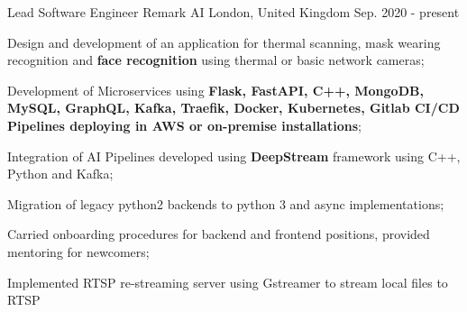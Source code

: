 

\begin{cventries}

   \cventry
    {Lead Software Engineer} %
    {Remark AI} %
    {London,  United Kingdom} %
    {Sep. 2020 - present} %
    {
      \begin{cvitems} %
        \item {Design and development of an application for thermal scanning,
        mask wearing recognition and \textbf{face recognition} using thermal or basic network cameras;}
        \item {Development of Microservices using \textbf{Flask, FastAPI, C++, MongoDB, MySQL, GraphQL, Kafka,
        Traefik, Docker, Kubernetes, Gitlab CI/CD Pipelines deploying in AWS or on-premise installations};}
        \item {Integration of AI Pipelines developed using \textbf{DeepStream} framework using C++, Python and Kafka;}
        \item {Migration of legacy python2 backends to python 3 and async implementations;}
        \item {Carried onboarding procedures for backend and frontend positions, provided mentoring for newcomers;}
        \item {Implemented RTSP re-streaming server using Gstreamer to stream local files to RTSP}
      \end{cvitems}
    }


\end{cventries}
